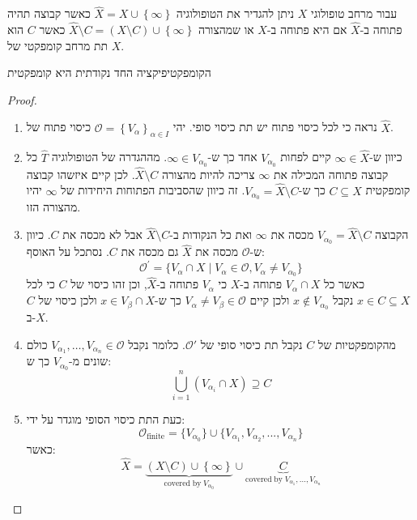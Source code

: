 \documentclass{tstextbook}
\begin{document}
\begin{definition}
עבור מרחב טופולוגי \(X\) ניתן להגדיר את הטופולוגיה \(\hat{X}=X\cup \left\{  \infty  \right\}\) כאשר קבוצה תהיה פתוחה ב-\(\hat{X}\) אם היא פתוחה ב-\(X\) או שמהצורה \(\hat{X} \setminus C=\left( X\setminus C \right)\cup \left\{  \infty  \right\}\) כאשר \(C\) הוא תת מרחב קומפקטי של \(X\).

\end{definition}
\begin{proposition}
הקומפקטיפיקציה החד נקודתית היא קומפקטית

\end{proposition}
\begin{proof}
  \begin{enumerate}
    \item נראה כי לכל כיסוי פתוח יש תת כיסוי סופי. יהי \(\mathcal{O}=\left\{  V_{\alpha}  \right\}_{\alpha \in I}\) כיסוי פתוח של \(\hat{X}\).  


    \item כיוון ש-\(\infty \in \hat{X}\) קיים לפחות \(V_{\alpha_{0}}\) אחד כך ש-\(\infty \in V_{\alpha_{0}}\). מההגדרה של הטופולוגיה \(\hat{T}\) כל קבוצה פתוחה המכילה את \(\infty\) צריכה להיות מהצורה \(\hat{X} \setminus C\). לכן קיים איזשהו קבוצה קומפקטית \(C\subseteq X\) כך ש-\(V_{\alpha_{0}}=\hat{X} \setminus C\). זה כיוון שהסביבות הפתוחות היחידות של \(\infty\) יהיו מהצורה הזו. 


    \item הקבוצה \(V_{\alpha_{0}}=\hat{X} \setminus C\) מכסה את \(\infty\) ואת כל הנקודות ב-\(\hat{X} \setminus C\) אבל לא מכסה את \(C\). כיוון ש-\(\mathcal{O}\) מכסה את \(\hat{X}\) גם מכסה את \(C\). נסתכל על האוסף: 
$${\mathcal{O}}^{\prime}=\{V_{\alpha}\cap X\mid V_{\alpha}\in{\mathcal{O}},V_{\alpha}\neq V_{\alpha_{0}}\}$$
כאשר כל \(V_{\alpha}\cap X\) פתוחה ב-\(X\) כי \(V_{\alpha}\) פתוחה ב-\(\hat{X}\), וכן זהו כיסוי של \(C\) כי לכל \(x \in C\subseteq X\) נקבל \(x \not \in V_{\alpha_{0}}\) ולכן קיים \(V_{\alpha }\neq V_{\beta}\in \mathcal{O}\) כך ש-\(x \in V_{\beta}\cap X\) ולכן כיסוי של \(C\) ב-\(X\).


    \item מהקומפקטיות של \(C\) נקבל תת כיסוי סופי של \(\mathcal{O'}\). כלומר נקבל \(V_{\alpha_{1}},\dots,V_{\alpha_{n}}\in \mathcal{O}\) כולם שונים מ-\(V_{\alpha_{0}}\) כך ש: 
$$\bigcup_{i=1}^{n}\left( V_{\alpha_{i}}\cap X \right)\supseteq C$$


    \item כעת התת כיסוי הסופי מוגדר על ידי: 
$${\mathcal{O}}_{\mathrm{finite}}=\{V_{\alpha_{0}}\}\cup\{V_{\alpha_{1}},V_{\alpha_{2}},...,V_{\alpha_{n}}\}$$
כאשר:
$$\hat{X}=\underbrace{\left(X\setminus C\right)\cup\left\{\infty\right\}}_{\mathrm{covered\;by\;}V_{\alpha_{0}}}\cup\underbrace{C}_{\mathrm{covered\;by\;}V_{\alpha_{1}},\ldots,V_{\alpha_{n}}}$$


  \end{enumerate}
\end{proof}
\end{document}
